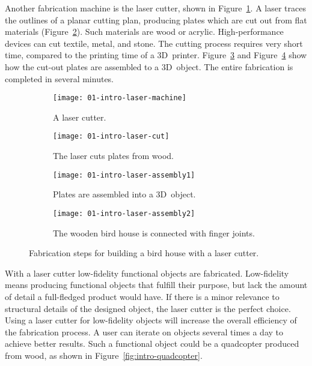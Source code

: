\documentclass[../ClassicThesis.tex]{subfiles}
\begin{document}

Another fabrication machine is the laser cutter, shown in
Figure~\ref{fig:intro-laser:machine}. A laser traces the
outlines of a planar cutting plan, producing plates which
are cut out from flat materials
(Figure~\ref{fig:intro-laser:cut}). Such materials are wood
or acrylic. High-performance devices can cut textile,
metal, and stone. The cutting process requires very short
time, compared to the printing time of a 3D~printer.
Figure~\ref{fig:intro-laser:assembly1} and
Figure~\ref{fig:intro-laser:assembly2} show how the cut-out
plates are assembled to a 3D~object. The entire fabrication
is completed in several minutes.


\begin{figure}[!ht]
  \centering
  \begin{subfigure}[b]{0.49\textwidth}
    \texttt{[image: 01-intro-laser-machine]}
    \caption{A laser cutter.}
    \label{fig:intro-laser:machine}
  \end{subfigure}
  \begin{subfigure}[b]{0.49\textwidth}
    \texttt{[image: 01-intro-laser-cut]}
    \caption{The laser cuts plates from wood.}
    \label{fig:intro-laser:cut}
  \end{subfigure}
  \begin{subfigure}[b]{0.49\textwidth}
    \texttt{[image: 01-intro-laser-assembly1]}
    \caption{Plates are assembled into a 3D~object. }
    \label{fig:intro-laser:assembly1}
  \end{subfigure}
  \begin{subfigure}[b]{0.49\textwidth}
    \texttt{[image: 01-intro-laser-assembly2]}
    \caption{The wooden bird house is connected with finger
      joints.}
    \label{fig:intro-laser:assembly2}
  \end{subfigure}
  \caption{Fabrication steps for building a bird house with
    a laser cutter.}
  \label{fig:intro-laser}
\end{figure}

With a laser cutter low-fidelity functional objects are
fabricated. Low-fidelity means producing functional objects
that fulfill their purpose, but lack the amount of detail a
full-fledged product would have. If there is a minor
relevance to structural details of the designed object, the
laser cutter is the perfect choice. Using a laser cutter for
low-fidelity objects will increase the overall efficiency of
the fabrication process. A user can iterate on objects
several times a day to achieve better results.
Such a functional object could be a quadcopter produced from
wood, as shown in Figure~\ref{fig:intro-quadcopter}.
\end{document}
